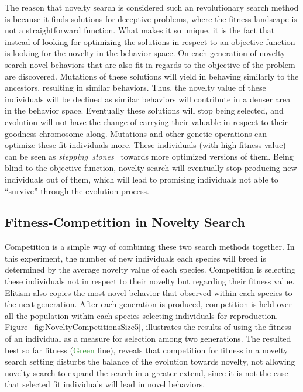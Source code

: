 The reason that novelty search is considered such an revolutionary search method is because it finds solutions for deceptive problems, where the fitness landscape is not a straightforward function. What makes it so unique, it is the fact that instead of looking for optimizing the solutions in respect to an objective function is looking for the novelty in the behavior space. On each generation of novelty search novel behaviors that are also fit in regards to the objective of the problem are discovered. Mutations of these solutions will yield in behaving similarly to the ancestors, resulting in similar behaviors. Thus, the novelty value of these individuals will be declined as similar behaviors will contribute in a denser area in the behavior space. Eventually these solutions will stop being selected, and evolution will not have the change of carrying their valuable in respect to their goodness chromosome along. Mutations and other genetic operations can optimize these fit individuals more. These individuals (with high fitness value) can be seen as \emph{stepping~stones}~\citep{lehman2011abandoning} towards more optimized versions of them. Being blind to the objective function, novelty search will eventually stop producing new individuals out of them, which will lead to promising individuals not able to ``survive'' through the evolution process.

\subsection*{Fitness-Competition in Novelty Search}


Competition is a simple way of combining these two search methods together. In this experiment, the number of new individuals each species will breed is determined by the average novelty value of each species. Competition is selecting these individuals not in respect to their novelty but regarding their fitness value. Elitism also copies the most novel behavior that observed within each species to the next generation. After each generation is produced, competition is held over all the population within each species selecting individuals for reproduction. Figure~\ref{fig:NoveltyCompetitionsSize5}, illustrates the results of using the fitness of an individual as a measure for selection among two generations. The resulted best so far fitness (\textcolor{ForestGreen}{Green} line), reveals that competition for fitness in a novelty search setting disturbs the balance of the evolution towards novelty, not allowing novelty search to expand the search in a greater extend, since it is not the case that selected fit individuals will lead in novel behaviors. 

